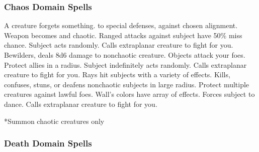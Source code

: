 \subsubsection{Chaos Domain Spells}

\begin{spelllist}
   A creature forgets something.
    to special defenses,  against chosen alignment.
   Weapon becomes  and chaotic.
   Ranged attacks against subject have 50\% miss chance.
   Subject acts randomly.
   Calls extraplanar creature to fight for you.
   Bewilders, deals 8d6 damage to nonchaotic creature.
   Objects attack your foes.
   Protect allies in a \areamed radius.
   Subject indefinitely acts randomly.
   Calls extraplanar creature to fight for you.
   Rays hit subjects with a variety of effects.
   Kills, confuses, stuns, or deafens nonchaotic subjects in large radius.
  \F Protect multiple creatures against lawful foes. 
   Wall's colors have array of effects.
   Forces subject to dance.
   Calls extraplanar creature to fight for you.
\end{spelllist}
*Summon chaotic creatures only

\subsubsection{Death Domain Spells}

